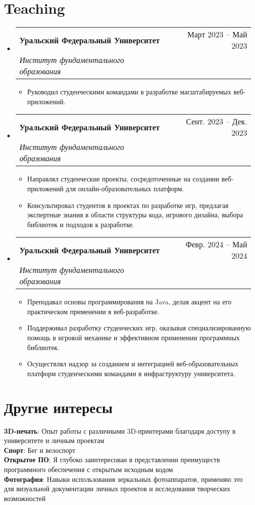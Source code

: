 \documentclass[a4paper,11pt]{article}
\makeatletter
\newcommand{\resumeItem}[1]{
    \item{
                {#1 \vspace{-4pt}}
          }
}
\newcommand{\resumeSubheading}[4]{
    \vspace{-2pt}\item
    \begin{tabular*}{0.97\textwidth}[t]{l@{\extracolsep{\fill}}r}
        \textbf{#1} & #2 \\
        \textit{\small #3} & \textit{\small #4} \\
    \end{tabular*}\vspace{-10pt}
}
\newcommand{\resumeSubHeadingListStart}{\begin{itemize}[leftmargin=0.15in, label={}]}
\newcommand{\resumeSubHeadingListEnd}{\end{itemize}}
\newcommand{\resumeItemListStart}{\begin{itemize}}
\newcommand{\resumeItemListEnd}{\end{itemize}\vspace{-2pt}}
\makeatother
\begin{document}
\section{Teaching}
\resumeSubHeadingListStart
    \resumeSubheading
        {Уральский Федеральный Университет}{Март 2023 -- Май 2023}
        {Институт фундаментального образования}{}
        \resumeItemListStart
            \small\resumeItem{Руководил студенческими командами в разработке масштабируемых веб-приложений.}
        \resumeItemListEnd

    \resumeSubheading
        {Уральский Федеральный Университет }{Сент. 2023 -- Дек. 2023}
        {Институт фундаментального образования}{}
        \resumeItemListStart
            \small\resumeItem{Направлял студенческие проекты, сосредоточенные на создании веб-приложений для онлайн-образовательных платформ.}
            \resumeItem{Консультировал студентов в проектах по разработке игр, предлагая экспертные знания в области структуры кода, игрового дизайна, выбора библиотек и подходов к разработке.}
        \resumeItemListEnd

    \resumeSubheading
        {Уральский Федеральный Университет}{Февр. 2024 -- Май 2024}
        {Институт фундаментального образования}{}
        \resumeItemListStart
            \small\resumeItem{Преподавал основы программирования на Java, делая акцент на его практическом применении в веб-разработке.}
            \resumeItem{Поддерживал разработку студенческих игр, оказывая специализированную помощь в игровой механике и эффективном применении программных библиотек.}
            \resumeItem{Осуществлял надзор за созданием и интеграцией веб-образовательных платформ студенческими командами в инфраструктуру университета.}
        \resumeItemListEnd
\resumeSubHeadingListEnd

\section{Другие интересы}
\begin{itemize}[leftmargin=0.15in, label={}]
    \normalsize{\item{
            \textbf{3D-печать}{: Опыт работы с различными 3D-принтерами благодаря доступу в университете и личным проектам} \\
            \textbf{Спорт}{: Бег и велоспорт} \\
            \textbf{Открытое ПО}{: Я глубоко заинтересован в представлении преимуществ программного обеспечения с открытым исходным кодом} \\
            \textbf{Фотография}{: Навыки использования зеркальных фотоаппаратов, применяю это для визуальной документации личных проектов и исследования творческих возможностей} \\
    }}    
\end{itemize}
\end{document}
